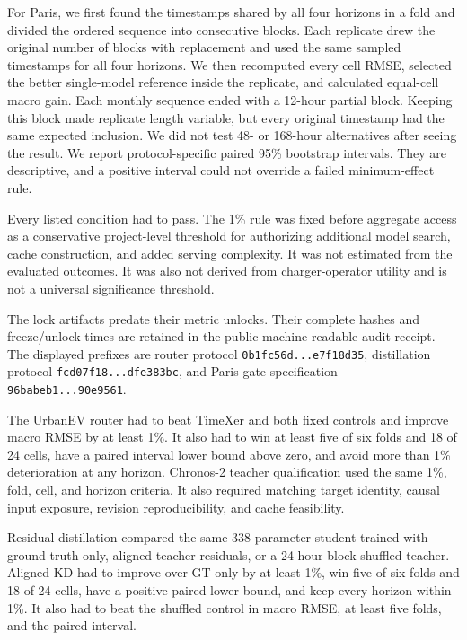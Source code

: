 For Paris, we first found the timestamps shared by all four horizons in a fold and divided the ordered sequence into consecutive blocks.  Each replicate drew the original number of blocks with replacement and used the same sampled timestamps for all four horizons.  We then recomputed every cell RMSE, selected the better single-model reference inside the replicate, and calculated equal-cell macro gain.  Each monthly sequence ended with a 12-hour partial block.  Keeping this block made replicate length variable, but every original timestamp had the same expected inclusion.  We did not test 48- or 168-hour alternatives after seeing the result.  We report protocol-specific paired 95\% bootstrap intervals.  They are descriptive, and a positive interval could not override a failed minimum-effect rule.

Every listed condition had to pass.  The 1\% rule was fixed before aggregate access as a conservative project-level threshold for authorizing additional model search, cache construction, and added serving complexity.  It was not estimated from the evaluated outcomes.  It was also not derived from charger-operator utility and is not a universal significance threshold.

The lock artifacts predate their metric unlocks.  Their complete hashes and freeze/unlock times are retained in the public machine-readable audit receipt.  The displayed prefixes are router protocol \texttt{0b1fc56d...e7f18d35}, distillation protocol \texttt{fcd07f18...dfe383bc}, and Paris gate specification \texttt{96babeb1...90e9561}.

The UrbanEV router had to beat TimeXer and both fixed controls and improve macro RMSE by at least 1\%.  It also had to win at least five of six folds and 18 of 24 cells, have a paired interval lower bound above zero, and avoid more than 1\% deterioration at any horizon.  Chronos-2 teacher qualification used the same 1\%, fold, cell, and horizon criteria.  It also required matching target identity, causal input exposure, revision reproducibility, and cache feasibility.

Residual distillation compared the same 338-parameter student trained with ground truth only, aligned teacher residuals, or a 24-hour-block shuffled teacher.  Aligned KD had to improve over GT-only by at least 1\%, win five of six folds and 18 of 24 cells, have a positive paired lower bound, and keep every horizon within 1\%.  It also had to beat the shuffled control in macro RMSE, at least five folds, and the paired interval.

